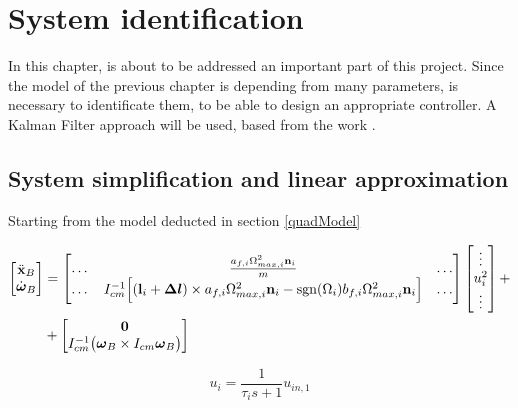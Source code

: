 \chapter{System identification}
\label{systemIdentification}

In this chapter, is about to be addressed an important part of this project. Since the model of the previous chapter is depending from many parameters, is necessary to identificate them, to be able to design an appropriate controller. A Kalman Filter approach will be used, based from the work \cite{modelIdentification}.

\section{System simplification and linear approximation}
\label{linearization}

Starting from the model deducted in section \ref{quadModel}

\begin{equation}
	\begin{split}
		\begin{bmatrix}
			\ddot{\mathbf{x}}_B \\
			\dot{\boldsymbol{\omega}}_B
		\end{bmatrix}
		&=
		\begin{bmatrix}
			\dots & \frac{a_{f,i}\Omega_{max,i}^2\mathbf{n}_i}{m} & \dots \\
			\dots & I_{cm}^{-1}\Big[ (\mathbf{l}_i+\boldsymbol{\Delta l})\times a_{f,i}\Omega^2_{max,i}\mathbf{n}_i-\operatorname*{sgn}(\Omega_i)b_{f,i}\Omega_{max,i}^2\mathbf{n}_i\Big] & \dots
		\end{bmatrix}
		\begin{bmatrix}
			\vdots \\
			u_i^2 \\
			\vdots
		\end{bmatrix}
		+ \\
		&+
		\begin{bmatrix}
			\mathbf{0} \\
			I_{cm}^{-1}\bigl(\boldsymbol{\omega}_B \times I_{cm} \boldsymbol{\omega}_B \bigl)
		\end{bmatrix} \\
	\end{split}
	\label{eq:finalModel1a}
\end{equation}

\begin{equation}
	u_i = \frac{1}{\tau_is+1}u_{in,1}
	\label{eq:finalModel2a}
\end{equation}

